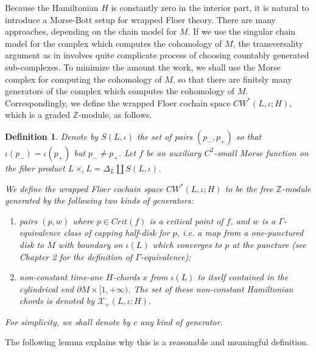 \documentclass{amsart}
\newtheorem{definition}[theorem]{Definition}
\numberwithin{equation}{section}
\numberwithin{figure}{section}
\begin{document}
	Because the Hamiltonian $H$ is constantly zero in the interior part, it is natural to introduce a Morse-Bott setup for wrapped Floer theory. There are many approaches, depending on the chain model for $M$. If we use the singular chain model for the complex which computes the cohomology of $M$, the transversality argument as in \cite{FOOO2} involves quite complicate process of choosing countably generated sub-complexes. To minimize the amount the work, we shall use the Morse complex for computing the cohomology of $M$, so that there are finitely many generators of the complex which computes the cohomology of $M$. Correspondingly, we define the wrapped Floer cochain space $CW^{*}(L, \iota; H)$, which is a graded $\mathbb{Z}$-module, as follows. \par

\begin{definition}\label{definition of wrapped Floer cochain space for a single Lagrangian immersion}
	Denote by $S(L, \iota)$ the set of pairs $(p_{-}, p_{+})$ so that $\iota(p_{-}) = \iota(p_{+})$ but $p_{-} \neq p_{+}$. Let $f$ be an auxiliary $C^{2}$-small Morse function on the fiber product $L \times_{\iota} L = \Delta_{L} \coprod S(L, \iota)$. \par
	We define the wrapped Floer cochain space $CW^{*}(L, \iota; H)$ to be the free $\mathbb{Z}$-module generated by the following two kinds of generators:
\begin{enumerate}[label=(\roman*)]

\item pairs $(p, w)$ where $p \in Crit(f)$ is a critical point of $f$, and $w$ is a $\Gamma$-equivalence class of capping half-disk for $p$, i.e. a map from a one-punctured disk to $M$ with boundary on $\iota(L)$ which converges to $p$ at the puncture (see \cite{FOOO1} Chapter 2 for the definition of $\Gamma$-equivalence);

\item non-constant time-one $H$-chords $x$ from $\iota(L)$ to itself contained in the cylindrical end $\partial M \times [1, +\infty)$. The set of these non-constant Hamiltonian chords is denoted by $\mathcal{X}_{+}(L, \iota; H)$.

\end{enumerate}

	For simplicity, we shall denote by $c$ any kind of generator.
\end{definition}

	The following lemma explains why this is a reasonable and meaningful definition. \par
\end{document}
